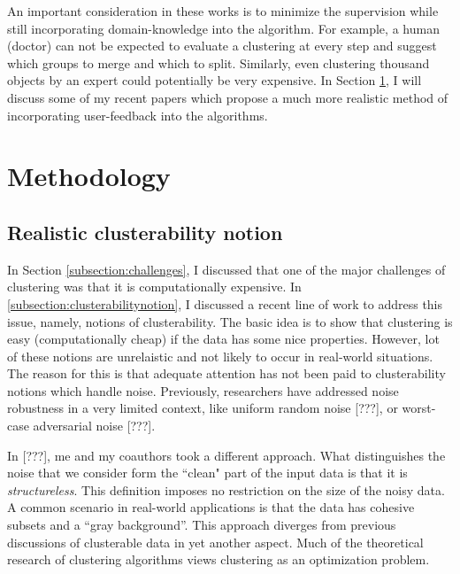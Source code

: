 \documentclass[11pt]{article}
\begin{document}
\vspace{0.1in}\noindent An important consideration in these works is to minimize the supervision while still incorporating domain-knowledge into the algorithm. For example, a human (doctor) can not be expected to evaluate a clustering at every step and suggest which groups to merge and which to split. Similarly, even clustering thousand objects by an expert could potentially be very expensive. In Section \ref{section:methodology}, I will discuss some of my recent papers which propose a much more realistic method of incorporating user-feedback into the algorithms.


\section{Methodology}
\label{section:methodology}
\subsection{Realistic clusterability notion}
In Section \ref{subsection:challenges}, I discussed that one of the major challenges of clustering was that it is computationally expensive. In \ref{subsection:clusterabilitynotion}, I discussed a recent line of work to address this issue, namely, notions of clusterability. The basic idea is to show that clustering is easy (computationally cheap) if the data has some nice properties. However, lot of these notions are unrelaistic and not likely to occur in real-world situations. The reason for this is that adequate attention has not been paid to clusterability notions which handle noise. Previously, researchers have addressed noise robustness in a very limited context, like uniform random noise {\color{red} [???]}, or worst-case adversarial noise {\color{red} [???]}.

In {\color{red} [???]}, me and my coauthors took a different approach. What distinguishes the noise that we consider form the ``clean" part of the input data is that it is \emph{structureless}. This definition imposes no restriction on the size of the noisy data. A common scenario in real-world applications is that the data has cohesive subsets and a ``gray background''.  This approach diverges from previous discussions of clusterable data in yet another aspect. Much of the theoretical research of clustering algorithms views clustering as an optimization problem. 
\end{document}
